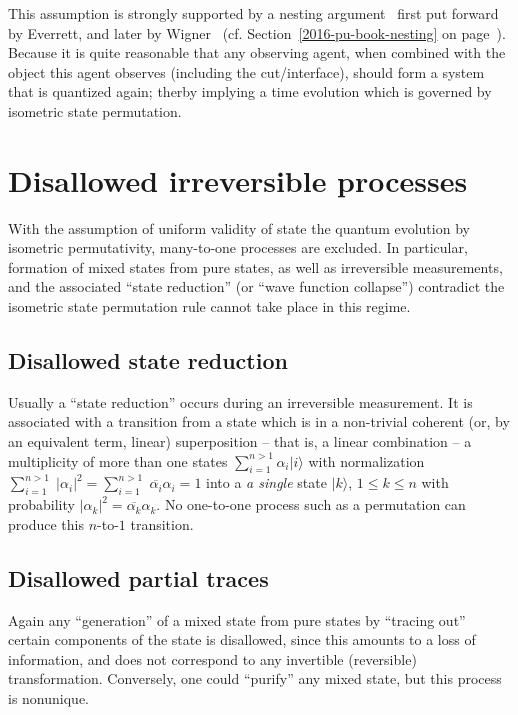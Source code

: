 This assumption is strongly supported by a nesting argument~\cite{sep-qm-everett,Barrett-16}
first put forward by Everrett, and later by Wigner~\cite{wigner:mb}
(cf. Section~\ref{2016-pu-book-nesting} on page~\pageref{2016-pu-book-nesting}).
Because it is quite reasonable that any observing agent, when combined with the object this agent observes (including the cut/interface),
should form a system that is quantized again; therby implying a time evolution which is governed by isometric state permutation.


\section{Disallowed irreversible processes}

With the assumption of uniform validity of state the quantum evolution by isometric permutativity,
many-to-one processes are excluded.
In particular, formation of mixed states from pure states, as well as
irreversible measurements, and the associated
``state reduction'' (or ``wave function collapse'') contradict the
isometric state permutation rule cannot take place in this regime.

\subsection{Disallowed state reduction}

Usually a ``state reduction''
occurs during an irreversible measurement.
It is associated with a transition from a state which is in a non-trivial coherent (or, by an equivalent term, linear)
superposition --
that is, a linear combination --
 a multiplicity of more than one states
$
\sum_{i=1}^{n>1} \alpha_i \vert i \rangle
$ with normalization
$
\sum_{i=1}^{n>1} \; \vert \alpha_i \vert^2=
\sum_{i=1}^{n>1} \; \overline{\alpha_i} \alpha_i
=1
$
into a {\em a single} state
$
\vert k \rangle
$, $1\le k\le n$
with probability  $\vert \alpha_k \vert^2=
\overline{\alpha_k} \alpha_k $.
 No  one-to-one process such as a permutation can produce  this $n$-to-$1$ transition.

\subsection{Disallowed partial traces}
Again any ``generation'' of a mixed state from pure states by ``tracing out'' certain components of the state is disallowed, since this
amounts to a loss of information, and does not correspond to any invertible (reversible) transformation.
Conversely,
one could ``purify'' any mixed state,
but this process is nonunique.


